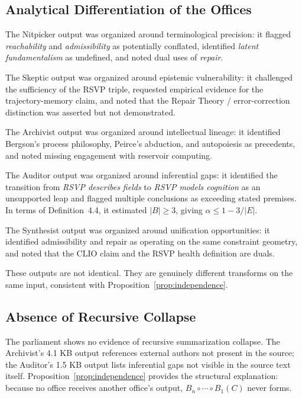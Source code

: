 \documentclass[12pt, a4paper]{article}
\theoremstyle{principle}
\theoremstyle{definition}
\begin{document}
\subsection{Analytical Differentiation of the Offices}

The Nitpicker output was organized around terminological precision: it flagged
\emph{reachability} and \emph{admissibility} as potentially conflated, identified
\emph{latent fundamentalism} as undefined, and noted dual uses of \emph{repair}.

The Skeptic output was organized around epistemic vulnerability: it challenged the
sufficiency of the RSVP triple, requested empirical evidence for the
trajectory-memory claim, and noted that the Repair Theory / error-correction
distinction was asserted but not demonstrated.

The Archivist output was organized around intellectual lineage: it identified
Bergson's process philosophy, Peirce's abduction, and autopoiesis as precedents,
and noted missing engagement with reservoir computing.

The Auditor output was organized around inferential gaps: it identified the
transition from \emph{RSVP describes fields} to \emph{RSVP models cognition} as
an unsupported leap and flagged multiple conclusions as exceeding stated premises.
In terms of Definition~4.4, it estimated $|B| \geq 3$, giving $\alpha \leq 1 - 3/|E|$.

The Synthesist output was organized around unification opportunities: it identified
admissibility and repair as operating on the same constraint geometry, and noted
that the CLIO claim and the RSVP health definition are duals.

These outputs are not identical. They are genuinely different transforms on the same
input, consistent with Proposition~\ref{prop:independence}.

\subsection{Absence of Recursive Collapse}

The parliament shows no evidence of recursive summarization collapse. The
Archivist's 4.1 KB output references external authors not present in the source;
the Auditor's 1.5 KB output lists inferential gaps not visible in the source text
itself. Proposition~\ref{prop:independence} provides the structural explanation:
because no office receives another office's output, $B_n \circ \cdots \circ B_1(C)$
never forms.
\end{document}
